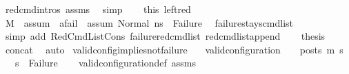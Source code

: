 \begin{isabellebody}
\ red{\isacharunderscore}{\kern0pt}cmd{\isachardot}{\kern0pt}intros{\isacharparenleft}{\kern0pt}{}{\isacharparenright}{\kern0pt}\ assms{\isacharparenleft}{\kern0pt}{}{\isacharparenright}{\kern0pt}\ \isamarkupfalse%
\ simp\isanewline
\ \ \isamarkupfalse%
\ this\ left{\isacharunderscore}{\kern0pt}red\ \isamarkupfalse%
\ {\isachardoublequoteopen}M{\isacharcomma}{\kern0pt}{\isasymLambda}{\isacharcomma}{\kern0pt}{\isasymGamma}{\isacharcomma}{\kern0pt}{\isasymOmega}\ {\isasymturnstile}\ {\isasymlangle}assum{}\ {\isacharat}{\kern0pt}\ {\isacharbrackleft}{\kern0pt}a{\isacharunderscore}{\kern0pt}fail{\isacharbrackright}{\kern0pt}\ {\isacharat}{\kern0pt}\ assum{}{\isacharcomma}{\kern0pt}\ Normal\ ns{}{\isasymrangle}\ {\isacharbrackleft}{\kern0pt}{\isasymrightarrow}{\isacharbrackright}{\kern0pt}\ Failure{\isachardoublequoteclose}\ \isamarkupfalse%
\ failure{\isacharunderscore}{\kern0pt}stays{\isacharunderscore}{\kern0pt}cmd{\isacharunderscore}{\kern0pt}list\ \isanewline
\ \ \ \ \isamarkupfalse%
\ {\isacharparenleft}{\kern0pt}simp\ add{\isacharcolon}{\kern0pt}\ RedCmdListCons\ failure{\isacharunderscore}{\kern0pt}red{\isacharunderscore}{\kern0pt}cmd{\isacharunderscore}{\kern0pt}list\ red{\isacharunderscore}{\kern0pt}cmd{\isacharunderscore}{\kern0pt}list{\isacharunderscore}{\kern0pt}append{\isacharparenright}{\kern0pt}\isanewline
\ \ \isamarkupfalse%
\ {\isacharquery}{\kern0pt}thesis\ \isamarkupfalse%
\ concat\ \isamarkupfalse%
\ auto\isanewline
{}\isamarkupfalse%
%
\endisatagproof
{\isafoldproof}%
%
\isadelimproof
\isanewline
%
\endisadelimproof
\isanewline
{}\isamarkupfalse%
\ valid{\isacharunderscore}{\kern0pt}config{\isacharunderscore}{\kern0pt}implies{\isacharunderscore}{\kern0pt}not{\isacharunderscore}{\kern0pt}failure{\isacharcolon}{\kern0pt}\isanewline
\ \ \ {\isachardoublequoteopen}valid{\isacharunderscore}{\kern0pt}configuration\ {\isasymLambda}\ {\isasymGamma}\ {\isasymOmega}\ posts\ m{\isacharprime}{\kern0pt}\ s{\isacharprime}{\kern0pt}{\isachardoublequoteclose}\isanewline
\ \ \ {\isachardoublequoteopen}s{\isacharprime}{\kern0pt}\ {\isasymnoteq}\ Failure{\isachardoublequoteclose}\isanewline
%
\isadelimproof
\ \ %
\endisadelimproof
%
\isatagproof
{}\isamarkupfalse%
\ valid{\isacharunderscore}{\kern0pt}configuration{\isacharunderscore}{\kern0pt}def\ assms\ \isamarkupfalse%

\end{isabellebody}
